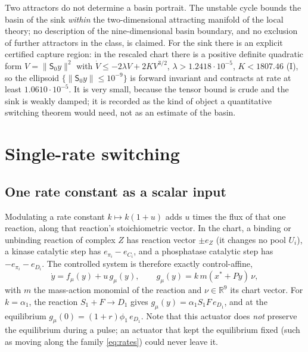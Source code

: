 \documentclass[11pt,a4paper]{article}
\theoremstyle{plain}
\theoremstyle{definition}
\theoremstyle{remark}
\newcommand{\R}{\mathbb R}
\newcommand{\norm}[1]{\lVert#1\rVert}
\newcommand{\evI}{\textsf{I}}
\begin{document}
Two attractors do not determine a basin portrait. The unstable cycle bounds the basin of the sink \emph{within} the two-dimensional attracting manifold of the local theory; no description of the nine-dimensional basin boundary, and no exclusion of further attractors in the class, is claimed. For the sink there is an explicit certified capture region: in the rescaled chart there is a positive definite quadratic form $V=\norm{\mathsf S_0y}^2$ with $\dot V\le-2\lambda V+2KV^{3/2}$, $\lambda>1.2418\cdot10^{-5}$, $K<1807.46$ (\evI), so the ellipsoid $\{\norm{\mathsf S_0y}\le10^{-9}\}$ is forward invariant and contracts at rate at least $1.0610\cdot10^{-5}$. It is very small, because the tensor bound is crude and the sink is weakly damped; it is recorded as the kind of object a quantitative switching theorem would need, not as an estimate of the basin.

\section{Single-rate switching}\label{sec:control}

\subsection{One rate constant as a scalar input}
Modulating a rate constant $k\mapsto k(1+u)$ adds $u$ times the flux of that one reaction, along that reaction's stoichiometric vector. In the chart, a binding or unbinding reaction of complex $Z$ has reaction vector $\pm e_Z$ (it changes no pool $U_i$), a kinase catalytic step has $e_{\pi_i}-e_{C_i}$, and a phosphatase catalytic step has $-e_{\pi_i}-e_{D_i}$. The controlled system is therefore exactly control-affine,
\begin{equation}\label{eq:affine}
\dot y=f_\mu(y)+u\,g_\mu(y),\qquad g_\mu(y)=k\,m(x^*+Py)\,\nu,
\end{equation}
with $m$ the mass-action monomial of the reaction and $\nu\in\R^9$ its chart vector. For $k=\alpha_1$, the reaction $S_1+F\to D_1$ gives $g_\mu(y)=\alpha_1S_1F\,e_{D_1}$, and at the equilibrium $g_\mu(0)=(1+r)\phi_1\,e_{D_1}$. Note that this actuator does \emph{not} preserve the equilibrium during a pulse; an actuator that kept the equilibrium fixed (such as moving along the family \eqref{eq:rates}) could never leave it.
\end{document}

